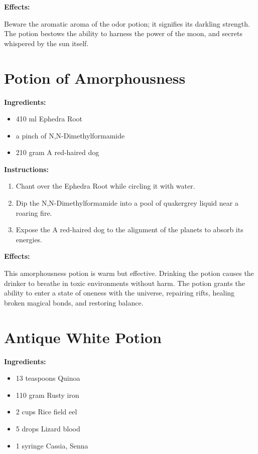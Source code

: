 \documentclass{article}
\begin{document}
\textbf{Effects:}

Beware the aromatic aroma of the odor potion; it signifies its darkling strength. The potion bestows the ability to harness the power of the moon, and secrets whispered by the sun itself.

\newpage
\section*{Potion of Amorphousness}

\textbf{Ingredients:}

\begin{itemize}
  \item 410 ml Ephedra Root
  \item a pinch of N,N-Dimethylformamide
  \item 210 gram A red-haired dog
\end{itemize}

\textbf{Instructions:}

\begin{enumerate}
  \item Chant over the Ephedra Root while circling it with water.
  \item Dip the N,N-Dimethylformamide into a pool of quakergrey liquid near a roaring fire.
  \item Expose the A red-haired dog to the alignment of the planets to absorb its energies.
\end{enumerate}

\textbf{Effects:}

This amorphousness potion is warm but effective. Drinking the potion causes the drinker to breathe in toxic environments without harm. The potion grants the ability to enter a state of oneness with the universe, repairing rifts, healing broken magical bonds, and restoring balance.

\newpage
\section*{Antique White Potion}

\textbf{Ingredients:}

\begin{itemize}
  \item 13 teaspoons Quinoa
  \item 110 gram Rusty iron
  \item 2 cups Rice field eel
  \item 5 drops Lizard blood
  \item 1 syringe Cassia, Senna
\end{itemize}
\end{document}

